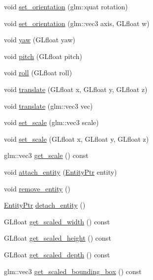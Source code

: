 \begin{DoxyCompactItemize}
\item 
void \hyperlink{classLarp_1_1Node_a3695bdfa48908be007d751e9c05bdb0e}{set\+\_\+orientation} (glm\+::quat rotation)
\item 
void \hyperlink{classLarp_1_1Node_a0d5e761af674c2c547e8638b91a2a85b}{set\+\_\+orientation} (glm\+::vec3 axis, G\+Lfloat w)
\item 
void \hyperlink{classLarp_1_1Node_a829a3cf29a5f165f7d771cc283f25053}{yaw} (G\+Lfloat yaw)
\item 
void \hyperlink{classLarp_1_1Node_ad8f8390e764a96398d080538c437c7ee}{pitch} (G\+Lfloat pitch)
\item 
void \hyperlink{classLarp_1_1Node_a1c839a3075f1e97aa368ba8212c50ee7}{roll} (G\+Lfloat roll)
\item 
void \hyperlink{classLarp_1_1Node_aa0186c5d77b58e2d7ede02dec0f2cdc4}{translate} (G\+Lfloat x, G\+Lfloat y, G\+Lfloat z)
\item 
void \hyperlink{classLarp_1_1Node_a7494be4e04c8f5911aedeeb41c27993b}{translate} (glm\+::vec3 vec)
\item 
void \hyperlink{classLarp_1_1Node_a20048e6f1487b9e6bdb5e2f66794de65}{set\+\_\+scale} (glm\+::vec3 scale)
\item 
void \hyperlink{classLarp_1_1Node_aa212fa28bc6cc6df4ded2a487fd591eb}{set\+\_\+scale} (G\+Lfloat x, G\+Lfloat y, G\+Lfloat z)
\item 
glm\+::vec3 \hyperlink{classLarp_1_1Node_a396cac721eb4a2cb46b14fc63f71ae8c}{get\+\_\+scale} () const 
\item 
void \hyperlink{classLarp_1_1Node_a2525a02b9ad2bd24e4d2a4338cd9a8e1}{attach\+\_\+entity} (\hyperlink{namespaceLarp_a775efcc4cabb308d50168c52df343353}{Entity\+Ptr} entity)
\item 
void \hyperlink{classLarp_1_1Node_a390c52314f7cb0f27244994aba34dc10}{remove\+\_\+entity} ()
\item 
\hyperlink{namespaceLarp_a775efcc4cabb308d50168c52df343353}{Entity\+Ptr} \hyperlink{classLarp_1_1Node_af32ccf64d85fa71079fa4755648f620f}{detach\+\_\+entity} ()
\item 
G\+Lfloat \hyperlink{classLarp_1_1Node_a95cf3fbe1ec65bca7a90d6ef13c2e6af}{get\+\_\+scaled\+\_\+width} () const 
\item 
G\+Lfloat \hyperlink{classLarp_1_1Node_aae8201315932cad238f72bfea116e12f}{get\+\_\+scaled\+\_\+height} () const 
\item 
G\+Lfloat \hyperlink{classLarp_1_1Node_a296b152b7e35bbbd64a91b5533087e41}{get\+\_\+scaled\+\_\+depth} () const 
\item 
glm\+::vec3 \hyperlink{classLarp_1_1Node_a3f83d9b01243b4a9ec4402be16f16333}{get\+\_\+scaled\+\_\+bounding\+\_\+box} () const 
\end{DoxyCompactItemize}

